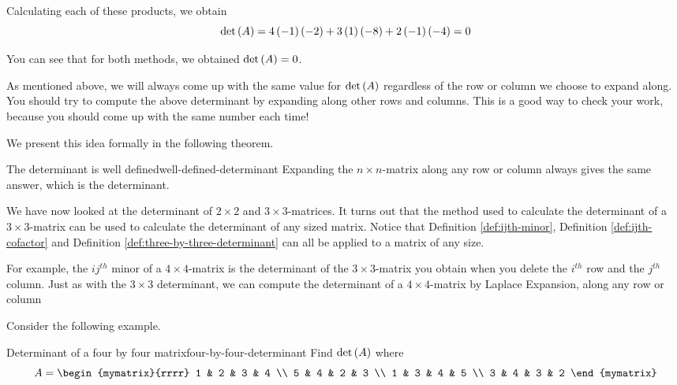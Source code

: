 \begin{solution}
Calculating each of these products, we obtain
\begin{equation*}
\det \left(A\right)
=
4\left(-1\right)\left(-2\right) 
+
3\left(1\right)\left(-8\right) 
+
2 \left(-1\right)\left(-4\right)
=
0
\end{equation*}

You can see that for both methods, we obtained $\det \left(A\right) = 0$. 
\end{solution}

As mentioned above, we will always come up with the same value for $\det \left(A\right)$ regardless of the row or column 
we choose to expand along. You should try to compute the above determinant by expanding along other
rows and columns. This is a good way to check your work, because you should come up 
with the same number each time!  

We present this idea formally in the following theorem.

\begin{theorem}{The determinant is well defined}{well-defined-determinant}
Expanding the $n\times n$-matrix along any row or column always gives the
same answer, which is the determinant.
\end{theorem}

We have now looked at the determinant of $2 \times 2$ and $3 \times 3$-matrices. It turns
out that the method used to calculate the determinant of a $3 \times 3$-matrix 
can be used to calculate the determinant of any sized matrix. Notice that
Definition \ref{def:ijth-minor}, Definition \ref{def:ijth-cofactor} and Definition \ref{def:three-by-three-determinant}
can all be applied to a matrix of any size. 

For example, the $ij^{th}$ minor of a $4 \times 4$-matrix is the determinant
of the $3 \times 3$-matrix you obtain when you delete the $i^{th}$ row and the $j^{th}$ column. 
Just as with the $3 \times 3$ determinant, we can compute the determinant of a $4 \times 4$-matrix by Laplace Expansion, 
along any row or column

Consider the following example. 

\begin{example}{Determinant of a four by four matrix}{four-by-four-determinant}
Find $\det \left(A\right) $ where
\begin{equation*}
A=\begin{mymatrix}{rrrr}
1 & 2 & 3 & 4 \\
5 & 4 & 2 & 3 \\
1 & 3 & 4 & 5 \\
3 & 4 & 3 & 2
\end{mymatrix}
\end{equation*}
\end{example}

